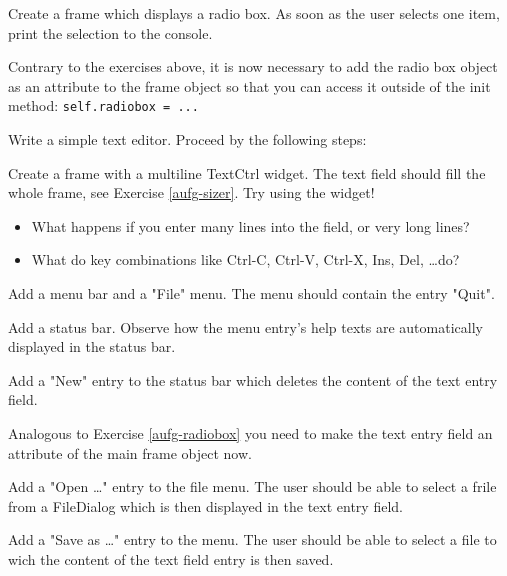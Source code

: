\begin{aufgabe}[RadioBox]
\label{aufg-radiobox}
Create a frame which displays a radio box. As soon as the user selects one item, print the selection to the console.

\hinweis Contrary to the exercises above, it is now necessary to add the radio box object as an attribute to the frame object so that you can access it outside of the init method: \lstinline{self.radiobox = ...}
\end{aufgabe}

\begin{aufgabe}
Write a simple text editor. Proceed by the following steps:
\begin{teilaufgabe}
Create a frame with a multiline TextCtrl widget. The text field should fill the whole frame, see Exercise \ref{aufg-sizer}. Try using the widget!
\begin{itemize}
\item What happens if you enter many lines into the field, or very long lines?
\item What do key combinations like Ctrl-C, Ctrl-V, Ctrl-X, Ins, Del, \dots do? 
\end{itemize}
\end{teilaufgabe}
\begin{teilaufgabe}[Menus]
Add a menu bar and a "File" menu. The menu should contain the entry "Quit".
\end{teilaufgabe}
\begin{teilaufgabe}
Add a status bar. Observe how the menu entry's help texts are automatically displayed in the status bar.
\end{teilaufgabe}
\begin{teilaufgabe}
Add a "New" entry to the status bar which deletes the content of the text entry field.

\hinweis Analogous to Exercise \ref{aufg-radiobox} you need to make the text entry field an attribute of the main frame object now.
\end{teilaufgabe}
\begin{teilaufgabe}
Add a "Open \dots" entry to the file menu. The user should be able to select a frile from a FileDialog which is then displayed in the text entry field.
\end{teilaufgabe}

\begin{teilaufgabe}[Save as]
Add a "Save as \dots" entry to the menu. The user should be able to select a file to wich the content of the text field entry is then saved.
\end{teilaufgabe}


\end{aufgabe}
